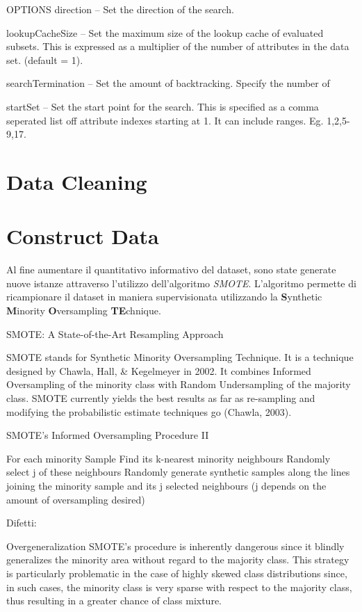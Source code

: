 OPTIONS
direction -- Set the direction of the search.

lookupCacheSize -- Set the maximum size of the lookup cache of evaluated subsets. This is expressed as a multiplier of the number of attributes in the data set. (default = 1).

searchTermination -- Set the amount of backtracking. Specify the number of 

startSet -- Set the start point for the search. This is specified as a comma seperated list off attribute indexes starting at 1. It can include ranges. Eg. 1,2,5-9,17.

\section{Data Cleaning}

\section{Construct Data}

Al fine aumentare il quantitativo informativo del dataset, sono state generate nuove istanze attraverso l'utilizzo dell'algoritmo \textit{SMOTE}. L'algoritmo permette di ricampionare il dataset in maniera supervisionata utilizzando la \textbf{S}ynthetic \textbf{M}inority \textbf{O}versampling \textbf{TE}chnique. 
\cite{Chawla02smote:synthetic}

SMOTE: A State-of-the-Art Resampling Approach 

SMOTE stands for Synthetic Minority Oversampling Technique. 
It is a technique designed by Chawla, Hall, \& Kegelmeyer  in 2002.
It combines Informed Oversampling of the minority class with Random Undersampling        of the majority class.
SMOTE currently yields the best results as far as re-sampling and modifying the probabilistic estimate techniques go (Chawla, 2003).

SMOTE’s Informed Oversampling Procedure II

For each minority Sample
	Find its k-nearest minority neighbours
	Randomly select j of these neighbours
	Randomly generate synthetic samples along the lines joining the minority sample and its j selected neighbours
(j depends on the amount of oversampling desired) 


Difetti:

Overgeneralization
SMOTE’s procedure is inherently dangerous since it blindly generalizes the minority area without regard to the majority class.
This strategy is particularly problematic in the case of highly skewed class distributions since, in such cases, the minority class is very sparse with respect to the majority class, thus resulting in a greater chance of class mixture.

